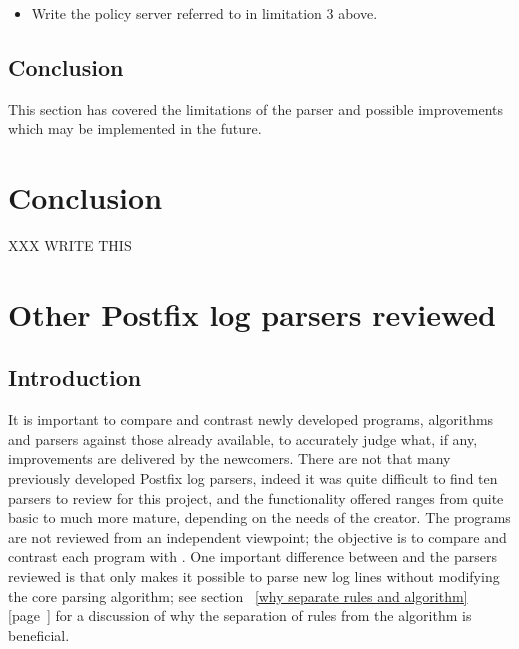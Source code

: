 \documentclass[a4paper,12pt,draft]{article}
\newcommand{\parsername}{\PLP{}}
\newcommand{\refwithpage}[1]{%
    \empty{}\ref{#1} [page~\pageref{#1}]%
}
\begin{document}
\begin{itemize}

    \item Write the policy server referred to in limitation 3 above.

\end{itemize}

\subsection{Conclusion}

This section has covered the limitations of the parser and possible
improvements which may be implemented in the future.

\section{Conclusion}

\label{conclusion}

XXX WRITE THIS


\appendix


\section{Other Postfix log parsers reviewed}

\label{other-parsers}

\subsection{Introduction}

It is important to compare and contrast newly developed programs,
algorithms and parsers against those already available, to accurately judge
what, if any, improvements are delivered by the newcomers.  There are not
that many previously developed Postfix log parsers, indeed it was quite
difficult to find ten parsers to review for this project, and the
functionality offered ranges from quite basic to much more mature,
depending on the needs of the creator.  The programs are not reviewed from
an independent viewpoint; the objective is to compare and contrast each
program with \parsername{}.  One important difference between \parsername{}
and the parsers reviewed is that only \parsername{} makes it possible to
parse new log lines without modifying the core parsing algorithm; see
section~\refwithpage{why separate rules and algorithm} for a discussion of
why the separation of rules from the algorithm is beneficial.
\end{document}
